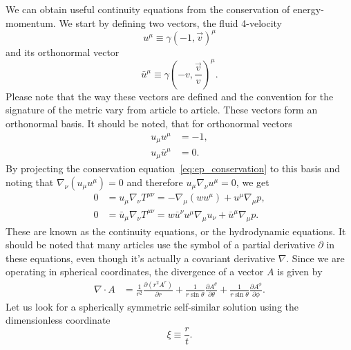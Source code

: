We can obtain useful continuity equations from the conservation of energy-momentum.
We start by defining two vectors, the fluid 4-velocity
\begin{equation}
u^\mu \equiv \gamma(-1, \overrightarrow{v})^\mu
\label{eq:u_mu}
\end{equation}
and its orthonormal vector
\begin{equation}
\bar{u}^\mu \equiv \gamma(-v, \frac{\overrightarrow{v}}{v})^\mu.
\end{equation}
Please note that the way these vectors are defined and the convention for the signature of the metric vary
from article to article.
These vectors form an orthonormal basis.
It should be noted, that for orthonormal vectors
\begin{align}
u_\mu u^\mu &= -1, \\
u_\mu \bar{u}^\mu &= 0.
\end{align}
By projecting the conservation equation~\eqref{eq:ep_conservation} to this basis and noting that
$\nabla_\nu (u_\mu u^\mu) = 0$ and therefore $u_\mu \nabla_\nu u^\mu = 0$, we get
\cite[eq. 7.28-7.29]{lecture_notes}
\begin{align}
0 &= u_\mu \nabla_\nu T^{\mu \nu} = -\nabla_\mu (w u^\mu) + u^\mu \nabla_\mu p,
\label{eq:continuity1} \\
0 &= \bar{u}_\mu \nabla_\nu T^{\mu \nu} = w \bar{u}^\nu u^\mu \nabla_\mu u_\nu + \bar{u}^\mu \nabla_\mu p.
\label{eq:continuity2}
\end{align}
These are known as the continuity equations, or the hydrodynamic equations.
It should be noted that many articles use the symbol of a partial derivative $\partial$ in these equations,
even though it's actually a covariant derivative $\nabla$.
Since we are operating in spherical coordinates,
the divergence of a vector $A$ is given by
\begin{align}
\nabla \cdot A
&= \frac{1}{r^2} \frac{\partial (r^2 A^r)}{\partial r}
+ \frac{1}{r \sin \theta} \frac{\partial A^\theta}{\partial \theta}
+ \frac{1}{r \sin \theta} \frac{\partial A^\phi}{\partial \phi}.
\label{eq:divergence}
\end{align}
Let us look for a spherically symmetric self-similar solution using the dimensionless coordinate
\begin{equation}
\xi \equiv \frac{r}{t}.
\end{equation}
